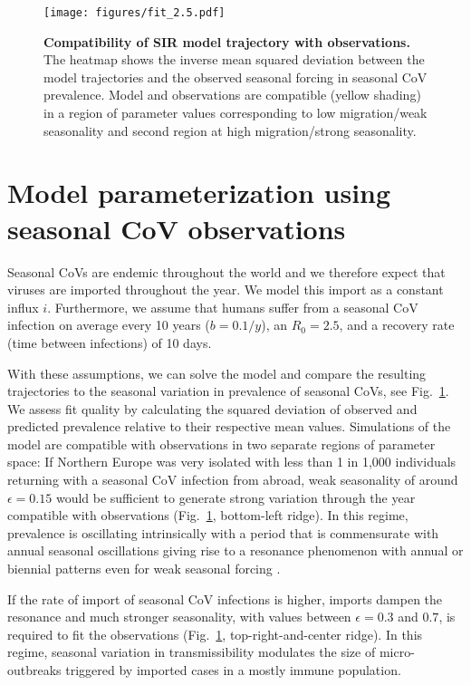 \documentclass[rmp, reprint, superscriptaddress, floatfix,amsmath]{revtex4-1}
\begin{document}
\begin{figure}
    \centering
    \texttt{[image: figures/fit\_2.5.pdf]}
    \caption{{\bf Compatibility of SIR model trajectory with observations.} The heatmap shows the inverse mean squared deviation between the model trajectories and the observed seasonal forcing in seasonal CoV prevalence. Model and observations are compatible (yellow shading) in a region of parameter values corresponding to low migration/weak seasonality and second region at high migration/strong seasonality. }
    \label{fig:parameter_seasonal}
\end{figure}

\section{Model parameterization using seasonal CoV observations}
Seasonal CoVs are endemic throughout the world and we therefore expect that viruses are imported throughout the year. 
We model this import as a constant influx $i$. 
Furthermore, we assume that humans suffer from a seasonal CoV infection on average every 10 years ($b=0.1/y$), an $R_0=2.5$, and a recovery rate (time between infections) of 10 days.

With these assumptions, we can solve the model and compare the resulting trajectories to the seasonal variation in prevalence of seasonal CoVs, see Fig.~\ref{fig:parameter_seasonal}.
We assess fit quality by calculating the squared deviation of observed and predicted prevalence relative to their respective mean values. 
Simulations of the model are compatible with observations in two separate regions of parameter space: If Northern Europe was very isolated with less than 1 in 1,000 individuals returning with a seasonal CoV infection from abroad, weak seasonality of around $\epsilon=0.15$ would be sufficient to generate strong variation through the year compatible with observations (Fig.~\ref{fig:parameter_seasonal}, bottom-left ridge).
In this regime, prevalence is oscillating intrinsically with a period that is commensurate with annual seasonal oscillations giving rise to a resonance phenomenon with annual or biennial patterns even for weak seasonal forcing \citep{dushoff_dynamical_2004,chen_regular_2017}.

If the rate of import of seasonal CoV infections is higher, imports dampen the resonance and much stronger seasonality, with values between $\epsilon=0.3$ and $0.7$, is required to fit the observations (Fig.~\ref{fig:parameter_seasonal}, top-right-and-center ridge).
In this regime, seasonal variation in transmissibility modulates the size of micro-outbreaks triggered by imported cases in a mostly immune population. 
\end{document}
